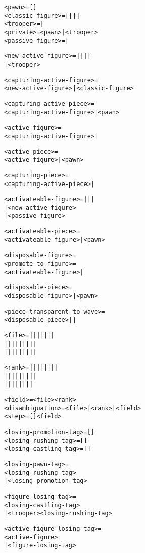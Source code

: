 \begin{alltt}
<pawn> = []
<classic-figure> =  |  |  |  | 
<trooper> =  | 
<private> = <pawn> | <trooper>
<passive-figure> =  | 

<new-active-figure> =  |  |  |  | 
                    | <trooper>

<capturing-active-figure> =
  <new-active-figure> | <classic-figure>

<capturing-active-piece> =
  <capturing-active-figure> | <pawn>

<active-figure> =
  <capturing-active-figure> | 

<active-piece> =
  <active-figure> | <pawn>

<capturing-piece> =
  <capturing-active-piece> | 

<activateable-figure> =  |  |  | 
                      | <new-active-figure>
                      | <passive-figure>

<activateable-piece> =
  <activateable-figure> | <pawn>

<disposable-figure> =
<promote-to-figure> =
  <activateable-figure> | 
\end{alltt}

\clearpage %

\begin{alltt}
<disposable-piece> =
  <disposable-figure> | <pawn>

<piece-transparent-to-wave> =
  <disposable-piece> |  | 

<file> =  |  |  |  |  |  |  | 
|  |  |  |  |  |  |  |  | 
|  |  |  |  |  |  |  |  | 

<rank> =  |  |  |  |  |  |  |  | 
|  |  |  |  |  |  |  |  | 
|  |  |  |  |  |  |  | 

<field> = <file><rank>
<disambiguation> = <file> | <rank> | <field>
<step> = []<field>

<losing-promotion-tag> = [\alg{==}]
<losing-rushing-tag> = [\alg{::}]
<losing-castling-tag> = [\alg{\&\&}]

<losing-pawn-tag> =
  <losing-rushing-tag>
| <losing-promotion-tag>

<figure-losing-tag> =
  <losing-castling-tag>
| <trooper><losing-rushing-tag>

<active-figure-losing-tag> =
  <active-figure>
| <figure-losing-tag>
\end{alltt}

